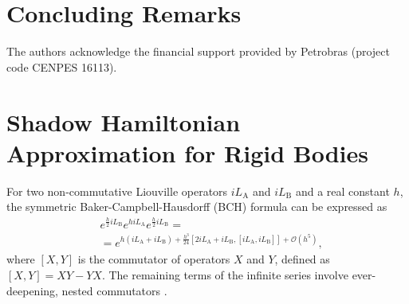 \documentclass[
journal=jctcce,
layout=twocolumn
]{achemso}
\newcommand{\Liu}[1]{i\!L_\text{#1}}            %
\newcommand{\timestep}{h}
\begin{document}


\section{Concluding Remarks}
\label{sec:conclusion}

\begin{acknowledgement}
	The authors acknowledge the financial support provided by Petrobras (project code CENPES 16113).
\end{acknowledgement}

\appendix
{}

\section{Shadow Hamiltonian Approximation for Rigid Bodies}
\label{sec:rigid body shadow hamiltonian}

For two non-commutative Liouville operators $\Liu A$ and $\Liu B$ and a real constant $\timestep$, the symmetric Baker-Campbell-Hausdorff (BCH) formula can be expressed as \cite{Hairer_2006}
\begin{equation}
\label{eq:symmetric BCH}
\begin{split}
&e^{\frac{\timestep}{2} \Liu B} e^{\timestep \Liu A} e^{\frac{\timestep}{2} \Liu B} = \\
&= e^{\timestep (\Liu A + \Liu B) + \frac{\timestep^3}{24} \left[2 \Liu A + \Liu B,[\Liu A,\Liu B]\right] + \mathcal{O}(\timestep^5)},
\end{split}
\end{equation}
where $[X,Y]$ is the commutator of operators $X$ and $Y$, defined as $[X,Y] = XY - YX$.
The remaining terms of the infinite series involve ever-deepening, nested commutators \cite{Hairer_2006}.
\end{document}
